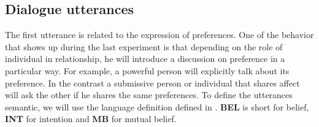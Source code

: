 \documentclass{llncs}
\begin{document}
\subsection{Dialogue utterances}
\par The first utterance is related to the expression of preferences. One of the behavior that shows up during the last experiment is that depending on the role of individual in relationship, he will introduce a discussion on preference in a particular way. For example, a powerful person will explicitly 
talk about its preference. In the contrast a submissive person or individual that shares affect will ask the other if he shares the same preferences. 
To define the utterances semantic, we will use the language definition defined in \cite{sidner}. \textbf{BEL} is short for belief, \textbf{INT} for intention and \textbf{MB} for mutual belief.
\end{document}

